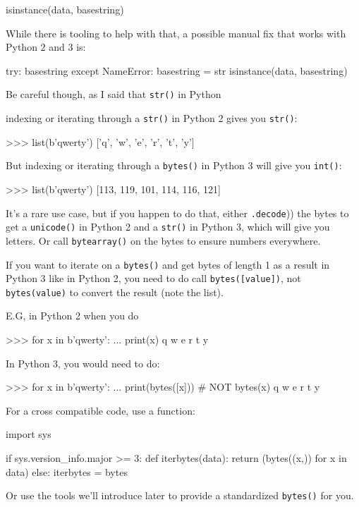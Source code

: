 \begin{py2}
isinstance(data, basestring)
\end{py2}

While there is tooling to help with that, a possible manual fix that works with Python 2 and 3 is:

\begin{py2and3}
try:
  basestring
except NameError:
  basestring = str
isinstance(data, basestring)
\end{py2and3}

Be careful though, as I said that \lstinline{str()} in Python

indexing or iterating through a \lstinline{str()} in Python 2 gives you \lstinline{str()}:

\begin{py2}
>>> list(b'qwerty')
['q', 'w', 'e', 'r', 't', 'y']
\end{py2}

But indexing or iterating through a \lstinline{bytes()} in Python 3 will give you \lstinline{int()}:

\begin{py2}
>>> list(b'qwerty')
[113, 119, 101, 114, 116, 121]
\end{py2}

It's a rare use case, but if you happen to do that, either \lstinline(.decode()) the bytes to get a \lstinline{unicode()} in Python 2 and a \lstinline{str()} in Python 3, which will give you letters. Or call \lstinline{bytearray()} on the bytes to ensure numbers everywhere.

\begin{warning}
If you want to iterate on a \lstinline{bytes()} and get bytes of length 1 as a result in Python 3 like in Python 2, you need to do call \lstinline{bytes([value])}, not \lstinline{bytes(value)} to convert the result (note the list).

E.G, in Python 2 when you do

\begin{py2}
>>> for x in b'qwerty':
...    print(x)
q
w
e
r
t
y

\end{py2}

In Python 3, you would need to do:

\begin{py3}
>>> for x in b'qwerty':
...    print(bytes([x])) # NOT bytes(x)
q
w
e
r
t
y

\end{py3}

For a cross compatible code, use a function:

\begin{py2and3}
import sys

if sys.version_info.major >= 3:
    def iterbytes(data):
        return (bytes((x,)) for x in data)
else:
    iterbytes = bytes
\end{py2and3}

Or use the tools we'll introduce later to provide a standardized \lstinline{bytes()} for you.

\end{warning}


